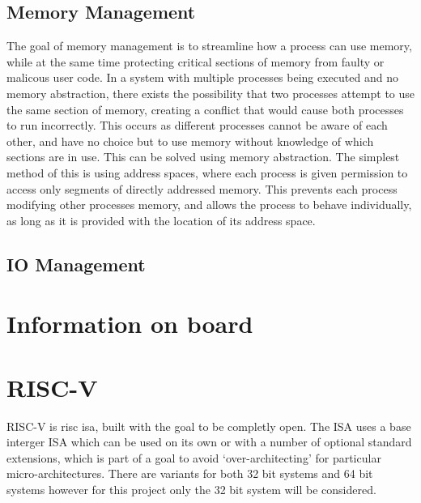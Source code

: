 \subsection{Memory Management}
The goal of memory management is to streamline how a process can use memory, while at the same time protecting critical sections of memory from faulty or malicous user code. In a system with multiple processes being executed and no memory abstraction, there exists the possibility that two processes attempt to use the same section of memory, creating a conflict that would cause both processes to run incorrectly. This occurs as different processes cannot be aware of each other, and have no choice but to use memory without knowledge of which sections are in use. This can be solved using memory abstraction. The simplest method of this is using address spaces, where each process is given permission to access only segments of directly addressed memory. This prevents each process modifying other processes memory, and allows the process to behave individually, as long as it is provided with the location of its address space.\cite{modern_operating}
\subsection{IO Management}
\section{Information on board}
\section{RISC-V}
RISC-V is \ac{risc} \ac{isa}, built with the goal to be completly open. The ISA uses a base interger ISA which can be used on its own or with a number of optional standard extensions, which is part of a goal to avoid `over-architecting' for particular micro-architectures. There are variants for both 32 bit systems and 64 bit systems however for this project only the 32 bit system will be considered.\cite{riscv_unpriv}
